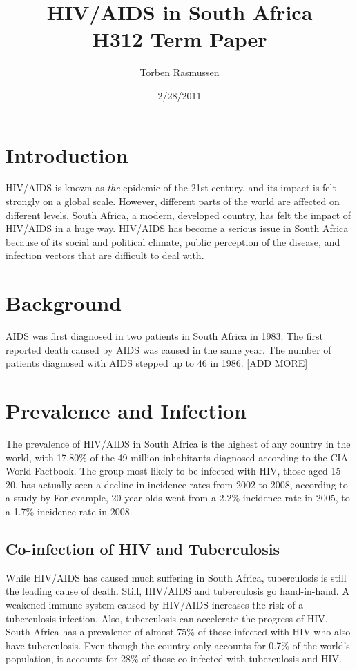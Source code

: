 \documentclass[letterpaper,12pt]{article}
\title{HIV/AIDS in South Africa \\ H312 Term Paper}
\author{Torben Rasmussen}
\date{2/28/2011}
\begin{document}
\thispagestyle{empty}
\maketitle
\newpage

\section{Introduction}
HIV/AIDS is known as \emph{the} epidemic of the 21st century, and its impact is felt strongly on a global scale.
However, different parts of the world are affected on different levels.  
South Africa, a modern, developed country, has felt the impact of HIV/AIDS in a huge way.  
HIV/AIDS has become a serious issue in South Africa because of its social and political climate, public perception of the disease, and infection vectors that are difficult to deal with. 

\section{Background}
AIDS was first diagnosed in two patients in South Africa in 1983.  The first reported death caused by AIDS was caused in the same year.
The number of patients diagnosed with AIDS stepped up to 46 in 1986. [ADD MORE]

\section{Prevalence and Infection}
The prevalence of HIV/AIDS in South Africa is the highest of any country in the world, with 17.80\% of the 49 million inhabitants diagnosed according to the CIA World Factbook.  
The group most likely to be infected with HIV, those aged 15-20, has actually seen a decline in incidence rates from 2002 to 2008, according to a study by 
For example, 20-year olds went from a 2.2\% incidence rate in 2005, to a 1.7\% incidence rate in 2008.

\subsection{Co-infection of HIV and Tuberculosis}
While HIV/AIDS has caused much suffering in South Africa, tuberculosis is still the leading cause of death.
Still, HIV/AIDS and tuberculosis go hand-in-hand.
A weakened immune system caused by HIV/AIDS increases the risk of a tuberculosis infection.
Also, tuberculosis can accelerate the progress of HIV.
South Africa has a prevalence of almost 75\% of those infected with HIV who also have tuberculosis.
Even though the country only accounts for 0.7\% of the world's population, it accounts for 28\% of those co-infected with tuberculosis and HIV.
\end{document}
